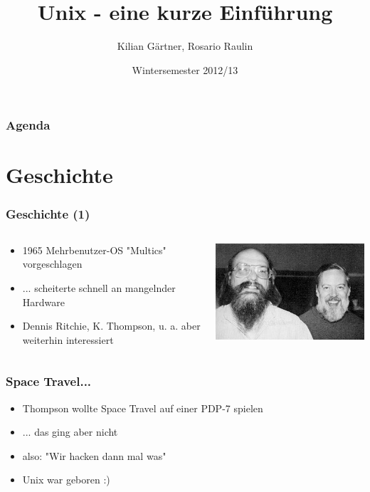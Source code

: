 \documentclass[12pt]{beamer}
\title{Unix - eine kurze Einführung}
\author{Kilian Gärtner, Rosario Raulin}
\date{Wintersemester 2012/13}
\begin{document}
\frame{\titlepage}

\begin{frame}
	\frametitle{Agenda}
	\tableofcontents
\end{frame}

\section{Geschichte}

\begin{frame}

	\frametitle{Geschichte (1)}

	\begin{columns}
		\begin{column}{0.7\textwidth}
			\begin{itemize}
				\item 1965 Mehrbenutzer-OS "Multics" vorgeschlagen
				\item ... scheiterte schnell an mangelnder Hardware
				\item Dennis Ritchie, K. Thompson, u. a. aber weiterhin interessiert
			\end{itemize}
		\end{column}


		\begin{column}{0.3\textwidth}
			\centerline{\includegraphics[scale=0.3]{src/img/thompson_richie}}
		\end{column}
	\end{columns}

\end{frame}

\begin{frame}
	
	\frametitle{Space Travel...}

	\begin{itemize}
		\item Thompson wollte Space Travel auf einer PDP-7 spielen
		\pause
		\item ... das ging aber nicht
		\pause
		\item also: "Wir hacken dann mal was"
		\pause
		\item Unix war geboren :)
	\end{itemize}

\end{frame}
\end{document}
